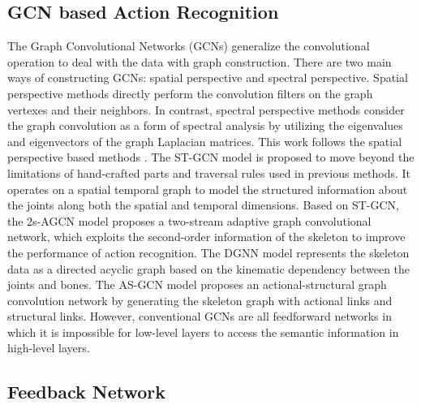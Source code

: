 \documentclass[runningheads]{llncs}
\begin{document}
\subsection{GCN based Action Recognition}
The Graph Convolutional Networks (GCNs) \cite{bruna2014spectral,niepert2016learning,duvenaud2015convolutional,henaff2015deep,kipf2017semi} generalize the convolutional operation to deal with the data with graph construction. There are two main ways of constructing GCNs: spatial perspective and spectral perspective. Spatial perspective methods \cite{bruna2014spectral,niepert2016learning} directly perform the convolution filters on the graph vertexes and their neighbors. In contrast, spectral perspective methods \cite{duvenaud2015convolutional,henaff2015deep,kipf2017semi} consider the graph convolution as a form of spectral analysis by utilizing the eigenvalues and eigenvectors of the graph Laplacian matrices.
This work follows the spatial perspective based methods \cite{yan2018spatial,shi2019two,shi2019skeleton,li2019actional}. The ST-GCN model \cite{yan2018spatial} is proposed to move beyond the limitations of hand-crafted parts and traversal rules used in previous methods. It operates on a spatial temporal graph to model the structured information about the joints along both the spatial and temporal dimensions. Based on ST-GCN, the 2s-AGCN model \cite{shi2019two} proposes a two-stream adaptive graph convolutional network, which exploits the second-order information of the skeleton to improve the performance of action recognition. The DGNN model \cite{shi2019skeleton} represents the skeleton data as a directed acyclic graph based on the kinematic dependency between the joints and bones. The AS-GCN model \cite{li2019actional} proposes an actional-structural graph convolution network by generating the skeleton graph with actional links and structural links. However, conventional GCNs are all feedforward networks in which it is impossible for low-level layers to access the semantic information in high-level layers.


\vspace{-1mm}
\subsection{Feedback Network}
\end{document}

